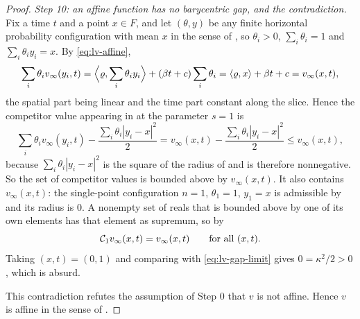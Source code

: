 \begin{proof}
\emph{Step 10: an affine function has no barycentric gap, and the contradiction.}
Fix a time $t$ and a point $x\in F$, and let $(\theta,y)$ be any finite
horizontal probability configuration with mean $x$ in the sense of
, so $\theta_i>0$, $\sum_i\theta_i=1$ and
$\sum_i\theta_iy_i=x$. By \eqref{eq:lv-affine},
\[
  \sum_i\theta_iv_\infty(y_i,t)
   =\Bigl\langle\varrho,\sum_i\theta_iy_i\Bigr\rangle
     +(\beta t+c)\sum_i\theta_i
   =\langle\varrho,x\rangle+\beta t+c=v_\infty(x,t),
\]
the spatial part being linear and the time part constant along the slice. Hence
the competitor value appearing in  at the parameter $s=1$ is
\[
  \sum_i\theta_iv_\infty(y_i,t)-\frac{\sum_i\theta_i|y_i-x|^2}{2}
   =v_\infty(x,t)-\frac{\sum_i\theta_i|y_i-x|^2}{2}\le v_\infty(x,t),
\]
because $\sum_i\theta_i|y_i-x|^2$ is the square of the radius of
 and is therefore nonnegative. So the set of competitor
values is bounded above by $v_\infty(x,t)$. It also contains $v_\infty(x,t)$:
the single-point configuration $n=1$, $\theta_1=1$, $y_1=x$ is admissible by
 and its radius is $0$. A nonempty set of reals that is
bounded above by one of its own elements has that element as supremum, so by
\[
  \mathcal{C}_1v_\infty(x,t)=v_\infty(x,t)\qquad\text{for all }(x,t).
\]
Taking $(x,t)=(0,1)$ and comparing with \eqref{eq:lv-gap-limit} gives
$0=\kappa^2/2>0$, which is absurd.

This contradiction refutes the assumption of Step 0 that $v$ is not affine.
Hence $v$ is affine in the sense of .
\end{proof}

